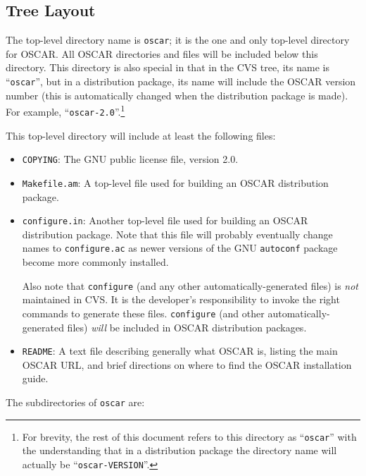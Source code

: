 \subsection{Tree Layout}

The top-level directory name is {\tt oscar}; it is the one and only
top-level directory for OSCAR.  All OSCAR directories and files will
be included below this directory.  This directory is also special in
that in the CVS tree, its name is ``{\tt oscar}'', but in a
distribution package, its name will include the OSCAR version number
(this is automatically changed when the distribution package is made).
For example, ``{\tt oscar-2.0}''.\footnote{For brevity, the rest of
  this document refers to this directory as ``{\tt oscar}'' with the
  understanding that in a distribution package the directory name will
  actually be ``{\tt oscar-VERSION}''.}

This top-level directory will include at least the following files:

\begin{itemize}
\item {\tt COPYING}: The GNU public license file, version 2.0.

\item {\tt Makefile.am}: A top-level file used for building an OSCAR
  distribution package.

\item {\tt configure.in}: Another top-level file used for building an
  OSCAR distribution package.  Note that this file will probably
  eventually change names to {\tt configure.ac} as newer versions of
  the GNU {\tt autoconf} package become more commonly installed.
  
  Also note that {\tt configure} (and any other
  automatically-generated files) is {\em not} maintained in CVS.  It
  is the developer's responsibility to invoke the right commands to
  generate these files.  {\tt configure} (and other
  automatically-generated files) {\em will} be included in OSCAR
  distribution packages.

\item {\tt README}: A text file describing generally what OSCAR is,
  listing the main OSCAR URL, and brief directions on where to find
  the OSCAR installation guide.
\end{itemize}

\noindent The subdirectories of {\tt oscar} are:

